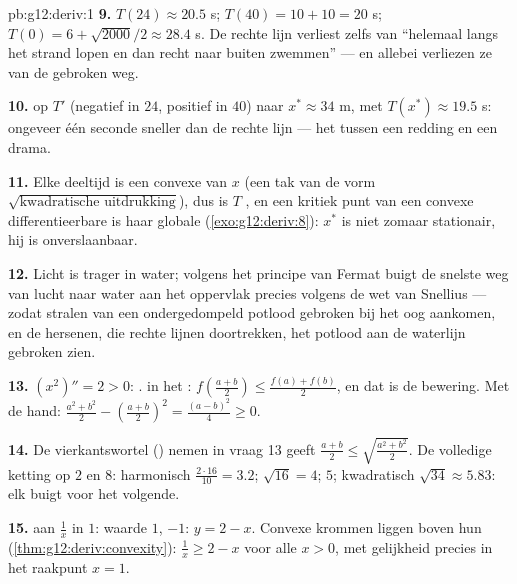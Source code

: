 \begin{solution}{pb:g12:deriv:1}
\textbf{9.} $T(24) \approx 20.5$ s; $T(40) = 10 + 10 = 20$ s;
$T(0) = 6 + \sqrt{2000}/2 \approx 28.4$ s. De rechte lijn verliest zelfs van
``helemaal langs het strand lopen en dan recht naar buiten zwemmen'' --- en
allebei verliezen ze van de gebroken weg.

\textbf{10.}  op $T'$ (negatief in $24$, positief in $40$)
 naar $x^* \approx 34$ m, met $T(x^*) \approx 19.5$ s: ongeveer
één seconde sneller dan de rechte lijn --- het  tussen een redding en
een drama.

\textbf{11.} Elke deeltijd is een convexe  van $x$ (een tak van de
vorm $\sqrt{\text{kwadratische uitdrukking}}$), dus is $T$ , en een
kritiek punt van een convexe differentieerbare  is haar globale
 (\cref{exo:g12:deriv:8}): $x^*$ is niet zomaar stationair, hij is
onverslaanbaar.

\textbf{12.} Licht is trager in water; volgens het principe van Fermat buigt
de snelste weg van lucht naar water aan het oppervlak precies volgens de wet
van Snellius --- zodat stralen van een ondergedompeld potlood gebroken bij het
oog aankomen, en de hersenen, die rechte lijnen doortrekken, het potlood aan
de waterlijn gebroken zien.

\textbf{13.} $(x^2)'' = 2 > 0$: .  in het :
$f\left(\frac{a+b}{2}\right) \leq \frac{f(a) + f(b)}{2}$, en dat is de
bewering. Met de hand:
$\frac{a^2 + b^2}{2} - \left(\frac{a+b}{2}\right)^2 = \frac{(a - b)^2}{4}
\geq 0$.

\textbf{14.} De vierkantswortel () nemen in vraag 13 geeft
$\frac{a + b}{2} \leq \sqrt{\frac{a^2 + b^2}{2}}$. De volledige ketting op
$2$ en $8$: harmonisch $\frac{2 \cdot 16}{10} = 3.2$; 
$\sqrt{16} = 4$;  $5$; kwadratisch $\sqrt{34} \approx 5.83$: elk
 buigt voor het volgende.

\textbf{15.}  aan $\frac1x$ in $1$: waarde $1$, 
$-1$: $y = 2 - x$. Convexe krommen liggen boven hun 
(\cref{thm:g12:deriv:convexity}): $\frac1x \geq 2 - x$ voor alle $x > 0$, met
gelijkheid precies in het raakpunt $x = 1$.


\end{solution}
